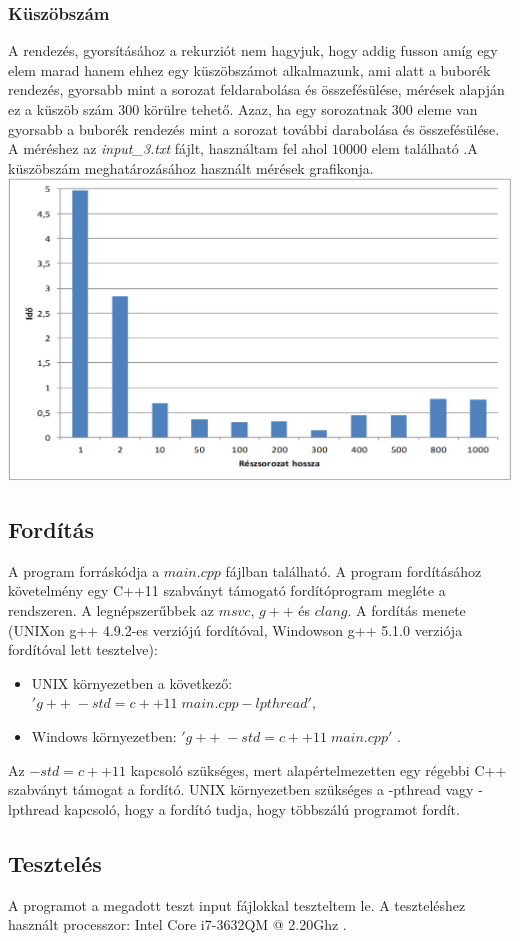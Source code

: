 \documentclass{article}
\begin{document}
\subsubsection{Küszöbszám}
A rendezés, gyorsításához a rekurziót nem hagyjuk, hogy addig fusson amíg egy elem marad hanem ehhez egy küszöbszámot alkalmazunk, ami alatt a buborék rendezés, gyorsabb mint a sorozat feldarabolása és összefésülése, mérések alapján ez a küszöb szám 300 körülre tehető. Azaz, ha egy sorozatnak 300 eleme van gyorsabb a buborék rendezés mint a sorozat további darabolása és összefésülése. A méréshez az 
\textit{input\_3.txt} fájlt, használtam fel ahol $10000$ elem található .A küszöbszám meghatározásához használt mérések grafikonja.
\includegraphics[scale=0.42]{meresek}
\subsection{Fordítás}
A program forráskódja a $main.cpp$ fájlban található.
A program fordításához követelmény egy C++11 szabványt támogató fordítóprogram megléte a rendszeren. A legnépszerűbbek az $msvc$, $g++$ és $clang$.
A fordítás menete (UNIXon g++ 4.9.2-es verziójú fordítóval, Windowson g++ 5.1.0 verziója fordítóval lett tesztelve):
\begin{itemize}
	\item UNIX környezetben a következő: $'g++ \; -std=c++11 \; main.cpp -lpthread'$,
	\item Windows környezetben: $'g++ \; -std=c++11 \; main.cpp'$ .
\end{itemize}
Az $-std=c++11$ kapcsoló szükséges, mert alapértelmezetten egy régebbi C++ szabványt támogat a fordító. UNIX környezetben szükséges a -pthread vagy -lpthread kapcsoló, hogy a fordító tudja, hogy többszálú programot fordít.

\subsection{Tesztelés}
A programot a megadott teszt input fájlokkal teszteltem le. A teszteléshez használt processzor: Intel Core i7-3632QM @ 2.20Ghz .\\
\end{document}
